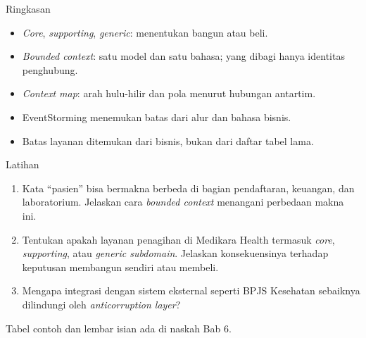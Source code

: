 \documentclass[aspectratio=169, table, 12pt]{beamer}
\begin{document}
\begin{frame}{{\Large Ringkasan}}
  \vspace{10pt}
  \begin{itemize}
    \item \textit{Core}, \textit{supporting}, \textit{generic}: menentukan bangun
          atau beli.
    \item \textit{Bounded context}: satu model dan satu bahasa; yang dibagi hanya
          identitas penghubung.
    \item \textit{Context map}: arah hulu-hilir dan pola menurut hubungan antartim.
    \item EventStorming menemukan batas dari alur dan bahasa bisnis.
    \item Batas layanan ditemukan dari bisnis, bukan dari daftar tabel lama.
  \end{itemize}
\end{frame}

\begin{frame}{{\Large Latihan}}
  \small
  \begin{enumerate}
    \item Kata ``pasien'' bisa bermakna berbeda di bagian pendaftaran, keuangan, dan
          laboratorium. Jelaskan cara \textit{bounded context} menangani perbedaan
          makna ini.
    \item Tentukan apakah layanan penagihan di Medikara Health termasuk
          \textit{core}, \textit{supporting}, atau \textit{generic subdomain}.
          Jelaskan konsekuensinya terhadap keputusan membangun sendiri atau membeli.
    \item Mengapa integrasi dengan sistem eksternal seperti BPJS Kesehatan sebaiknya
          dilindungi oleh \textit{anticorruption layer}?
  \end{enumerate}
  \vspace{6pt}
  {\footnotesize Tabel contoh dan lembar isian ada di naskah Bab 6.}
\end{frame}
\end{document}
